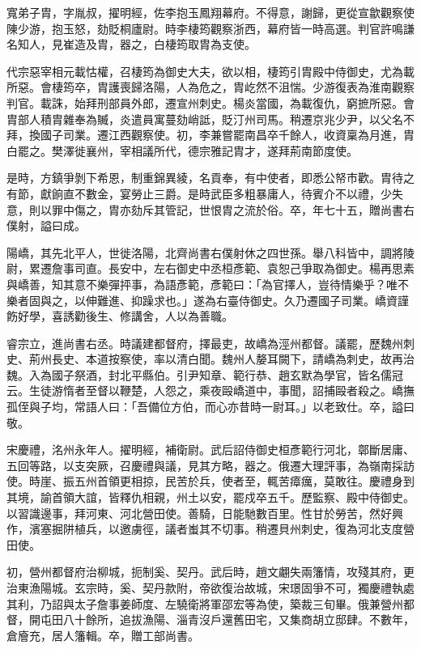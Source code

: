 \begin{pinyinscope}
 寬弟子胄，字胤叔，擢明經，佐李抱玉鳳翔幕府。不得意，謝歸，更從宣歙觀察使陳少游，抱玉怒，劾貶桐廬尉。時李棲筠觀察浙西，幕府皆一時高選。判官許鳴謙名知人，見崔造及胄，器之，白棲筠取胄為支使。



 代宗惡宰相元載怙權，召棲筠為御史大夫，欲以相，棲筠引胄殿中侍御史，尤為載所惡。會棲筠卒，胄護喪歸洛陽，人為危之，胄屹然不沮惴。少游復表為淮南觀察判官。載誅，始拜刑部員外郎，遷宣州刺史。楊炎當國，為載復仇，窮摭所惡。會胄部人積胄雜奉為贓，炎遣員寓蔓劾峭詆，貶汀州司馬。稍遷京兆少尹，以父名不拜，換國子司業。遷江西觀察使。初，李兼嘗罷南昌卒千餘人，收資稟為月進，胄白罷之。樊澤徙襄州，宰相議所代，德宗雅記胄才，遂拜荊南節度使。



 是時，方鎮爭剝下希恩，制重錦異綾，名貢奉，有中使者，即悉公帑市歡。胄待之有節，獻餉直不數金，宴勞止三爵。是時武臣多粗暴庸人，待賓介不以禮，少失意，則以罪中傷之，胄亦劾斥其管記，世恨胄之流於俗。卒，年七十五，贈尚書右僕射，謚曰成。



 陽嶠，其先北平人，世徙洛陽，北齊尚書右僕射休之四世孫。舉八科皆中，調將陵尉，累遷詹事司直。長安中，左右御史中丞桓彥範、袁恕己爭取為御史。楊再思素與嶠善，知其意不樂彈抨事，為語彥範，彥範曰：「為官擇人，豈待情樂乎？唯不樂者固與之，以伸難進、抑躁求也。」遂為右臺侍御史。久乃遷國子司業。嶠資謹飭好學，喜誘勸後生、修講舍，人以為善職。



 睿宗立，進尚書右丞。時議建都督府，擇最吏，故嶠為涇州都督。議罷，歷魏州刺史、荊州長史、本道按察使，率以清白聞。魏州人嫠耳闕下，請嶠為刺史，故再治魏。入為國子祭酒，封北平縣伯。引尹知章、範行恭、趙玄默為學官，皆名儒冠云。生徒游惰者至督以鞭楚，人怨之，乘夜毆嶠道中，事聞，詔捕毆者殺之。嶠撫孤侄與子均，常語人曰：「吾備位方伯，而心亦昔時一尉耳。」以老致仕。卒，謚曰敬。



 宋慶禮，洺州永年人。擢明經，補衛尉。武后詔侍御史桓彥範行河北，鄣斷居庸、五回等路，以支突厥，召慶禮與議，見其方略，器之。俄遷大理評事，為嶺南採訪使。時崖、振五州首領更相掠，民苦於兵，使者至，輒苦瘴癘，莫敢往。慶禮身到其境，諭首領大誼，皆釋仇相親，州土以安，罷戍卒五千。歷監察、殿中侍御史。以習識邊事，拜河東、河北營田使。善騎，日能馳數百里。性甘於勞苦，然好興作，濱塞掘阱植兵，以邀虜徑，議者蚩其不切事。稍遷貝州刺史，復為河北支度營田使。



 初，營州都督府治柳城，扼制奚、契丹。武后時，趙文翽失兩籓情，攻殘其府，更治東漁陽城。玄宗時，奚、契丹款附，帝欲復治故城，宋璟固爭不可，獨慶禮執處其利，乃詔與太子詹事姜師度、左驍衛將軍邵宏等為使，築裁三旬畢。俄兼營州都督，開屯田八十餘所，追拔漁陽、淄青沒戶還舊田宅，又集商胡立邸肆。不數年，倉廥充，居人籓輯。卒，贈工部尚書。




\end{pinyinscope}
